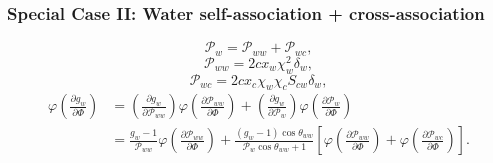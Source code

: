 \subsubsection{Special Case II: Water self-association +  cross-association}

\begin{equation}
        \mathcal{P}_{w} =  \mathcal{P}_{ww} + \mathcal{P}_{wc},
        \label{Prob_association_water}
\end{equation} 
\begin{equation}
        \mathcal{P}_{ww} = 2c x_w\chi_{w}^2 \delta_w,
        \label{P_ww}
\end{equation} 
\begin{equation}
        \mathcal{P}_{wc} = 2c x_c\chi_{w}\chi_{c} S_{cw}\delta_w,
        \label{P_wc}
\end{equation} 
\begin{equation}
\begin{aligned}
           \varphi \left ( \frac{\partial g_w}{\partial \Phi} \right ) & =  \left ( \frac{\partial g_w}{\partial \mathcal{P}_{ww}} \right ) \varphi\left ( \frac{\partial \mathcal{P}_{ww}}{\partial \Phi} \right ) + \left ( \frac{\partial g_w}{\partial \mathcal{P}_{w}} \right ) \varphi\left ( \frac{\partial \mathcal{P}_{w}}{\partial \Phi} \right ) \\
           & = \frac{g_w-1 }{ \mathcal{P}_{ww} }  \varphi\left ( \frac{\partial \mathcal{P}_{ww}}{\partial \Phi} \right ) + \frac{\left (g_w-1 \right )\cos{\theta_{ww}}}{ \mathcal{P}_{w} \cos{\theta_{ww}}  + 1}  \left [  \varphi\left ( \frac{\partial \mathcal{P}_{ww}}{\partial \Phi} \right ) + \varphi\left ( \frac{\partial \mathcal{P}_{wc}}{\partial \Phi} \right ) \right ].
        \label{dgwdPhi}
\end{aligned}
\end{equation}

